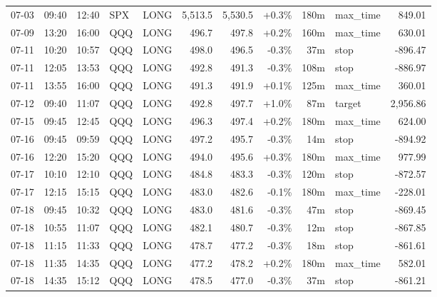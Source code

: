 \documentclass[11pt,a4paper,twoside]{article}
\begin{document}
\begin{center}
\begin{longtable}{>{\color{txtmain}}l l l l l r r r r >{\color{txtmain}}l r}
07-03 & 09:40 & 12:40 & SPX & LONG & 5,513.5 & 5,530.5 & \textcolor{wingreen}{+0.3\%} & 180m & max\_time & \textcolor{wingreen}{849.01} \\
07-09 & 13:20 & 16:00 & QQQ & LONG & 496.7 & 497.8 & \textcolor{wingreen}{+0.2\%} & 160m & max\_time & \textcolor{wingreen}{630.01} \\
07-11 & 10:20 & 10:57 & QQQ & LONG & 498.0 & 496.5 & \textcolor{lossred}{-0.3\%} & 37m & stop & \textcolor{lossred}{-896.47} \\
07-11 & 12:05 & 13:53 & QQQ & LONG & 492.8 & 491.3 & \textcolor{lossred}{-0.3\%} & 108m & stop & \textcolor{lossred}{-886.97} \\
07-11 & 13:55 & 16:00 & QQQ & LONG & 491.3 & 491.9 & \textcolor{wingreen}{+0.1\%} & 125m & max\_time & \textcolor{wingreen}{360.01} \\
07-12 & 09:40 & 11:07 & QQQ & LONG & 492.8 & 497.7 & \textcolor{wingreen}{+1.0\%} & 87m & target & \textcolor{wingreen}{2,956.86} \\
07-15 & 09:45 & 12:45 & QQQ & LONG & 496.3 & 497.4 & \textcolor{wingreen}{+0.2\%} & 180m & max\_time & \textcolor{wingreen}{624.00} \\
07-16 & 09:45 & 09:59 & QQQ & LONG & 497.2 & 495.7 & \textcolor{lossred}{-0.3\%} & 14m & stop & \textcolor{lossred}{-894.92} \\
07-16 & 12:20 & 15:20 & QQQ & LONG & 494.0 & 495.6 & \textcolor{wingreen}{+0.3\%} & 180m & max\_time & \textcolor{wingreen}{977.99} \\
07-17 & 10:10 & 12:10 & QQQ & LONG & 484.8 & 483.3 & \textcolor{lossred}{-0.3\%} & 120m & stop & \textcolor{lossred}{-872.57} \\
07-17 & 12:15 & 15:15 & QQQ & LONG & 483.0 & 482.6 & \textcolor{lossred}{-0.1\%} & 180m & max\_time & \textcolor{lossred}{-228.01} \\
07-18 & 09:45 & 10:32 & QQQ & LONG & 483.0 & 481.6 & \textcolor{lossred}{-0.3\%} & 47m & stop & \textcolor{lossred}{-869.45} \\
07-18 & 10:55 & 11:07 & QQQ & LONG & 482.1 & 480.7 & \textcolor{lossred}{-0.3\%} & 12m & stop & \textcolor{lossred}{-867.85} \\
07-18 & 11:15 & 11:33 & QQQ & LONG & 478.7 & 477.2 & \textcolor{lossred}{-0.3\%} & 18m & stop & \textcolor{lossred}{-861.61} \\
07-18 & 11:35 & 14:35 & QQQ & LONG & 477.2 & 478.2 & \textcolor{wingreen}{+0.2\%} & 180m & max\_time & \textcolor{wingreen}{582.01} \\
07-18 & 14:35 & 15:12 & QQQ & LONG & 478.5 & 477.0 & \textcolor{lossred}{-0.3\%} & 37m & stop & \textcolor{lossred}{-861.21} \\

\end{longtable}
\end{center}
\end{document}
